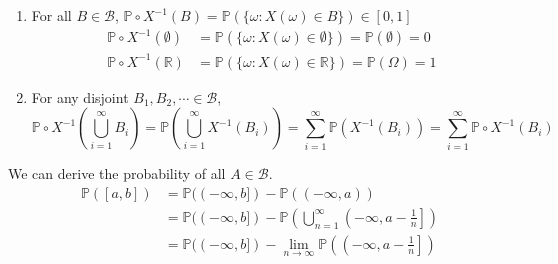 \documentclass{huhtakm-template-book}
\newcommand{\prob}{\mathbb{P}}
\begin{document}
    \begin{proofing}
        \begin{enumerate}
            \item For all $B\in\mathcal{B}$, $\prob\circ X^{-1}(B)=\prob(\{\omega:X(\omega)\in B\})\in [0,1]$
            \begin{align*}
                \prob\circ X^{-1}(\emptyset)&=\prob(\{\omega:X(\omega)\in\emptyset\})=\prob(\emptyset)=0\\
                \prob\circ X^{-1}(\mathbb{R})&=\prob(\{\omega:X(\omega)\in\mathbb{R}\})=\prob(\Omega)=1
            \end{align*}
            \item For any disjoint $B_{1},B_{2},\cdots\in\mathcal{B}$,
            \begin{equation*}
                \prob\circ X^{-1}\left(\bigcup_{i=1}^{\infty}B_{i}\right)=\prob\left(\bigcup_{i=1}^{\infty}X^{-1}(B_{i})\right)=\sum_{i=1}^{\infty}\prob(X^{-1}(B_{i}))=\sum_{i=1}^{\infty}\prob\circ X^{-1}(B_{i})
            \end{equation*}
        \end{enumerate}
    \end{proofing}
    \begin{rem}
        We can derive the probability of all $A\in\mathcal{B}$.
        \begin{align*}
            \prob([a,b])&=\prob((-\infty,b])-\prob((-\infty,a))\\
            &=\prob((-\infty,b])-\prob\left(\bigcup_{n=1}^{\infty}\left(-\infty,a-\frac{1}{n}\right]\right)\\
            &=\prob((-\infty,b])-\lim_{n\to\infty}\prob\left(\left(-\infty,a-\frac{1}{n}\right]\right)
        \end{align*}
    \end{rem}

    \newpage
\end{document}
